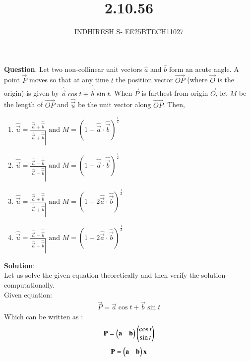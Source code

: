 \documentclass[journal]{IEEEtran}
\theoremstyle{remark}
\begin{document}

\onecolumn

\title{2.10.56}
\author{INDHIRESH S- EE25BTECH11027}
\maketitle


\renewcommand{\thefigure}{\theenumi}
\renewcommand{\thetable}{\theenumi}

\textbf{Question}.  Let two non-collinear unit vectors $\hat{a}$ and $\hat{b}$ form an acute angle. A point $\vec{P}$ moves so that at any time $t$ the position vector $\overrightarrow{OP}$ (where $\vec{O}$ is the origin) is given by $\hat{\vec{a}}\cos{t} + \hat{\vec{b}}\sin{t}$. When $\vec{P}$ is farthest from origin $\vec{O}$, let $M$ be the length of $\overrightarrow{OP}$ and $\hat{\vec{u}}$ be the unit vector along $\overrightarrow{OP}$. Then,
\begin{multicols}{2} 
    \begin{enumerate}
	    \item $\hat{\vec{u}} = \frac{\hat{\vec{a}}+\hat{\vec{b}}}{|\hat{\vec{a}}+\hat{\vec{b}}|} \text{ and } M = (1+\hat{\vec{a}} \cdot \hat{\vec{b}})^{\frac{1}{2}}$
    	\item $\hat{\vec{u}} = \frac{\hat{\vec{a}}-\hat{\vec{b}}}{|\hat{\vec{a}}-\hat{\vec{b}}|} \text{ and } M = (1+\hat{\vec{a}} \cdot \hat{\vec{b}})^{\frac{1}{2}}$
    	\item $\hat{\vec{u}} = \frac{\hat{\vec{a}}+\hat{\vec{b}}}{|\hat{\vec{a}}+\hat{\vec{b}}|} \text{ and } M = (1+2\hat{\vec{a}} \cdot \hat{\vec{b}})^{\frac{1}{2}}$
    	\item $\hat{\vec{u}} = \frac{\hat{\vec{a}}-\hat{\vec{b}}}{|\hat{\vec{a}}-\hat{\vec{b}}|} \text{ and } M = (1+2\hat{\vec{a}} \cdot \hat{\vec{b}})^{\frac{1}{2}}$
    \end{enumerate}
    \end{multicols}
\textbf{Solution}:\\
Let us solve the given equation theoretically and then verify the solution computationally. \\
Given equation:
\begin{align}
     \Vec{P}=\vec{a}\cos{t} + \vec{b}\sin{t}
\end{align}
Which can be written as :
\begin{align}
    \Vec{P}=\myvec{\vec{a}&\vec{b}}\myvec{\cos{t}\\\sin{t}}
\end{align}
\begin{align}
    \Vec{P}=\myvec{\Vec{a}&\Vec{b}}\Vec{x}
\end{align}
\end{document}
